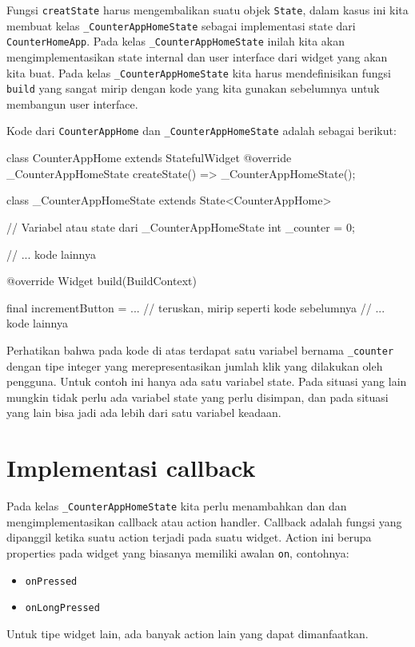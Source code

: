 \documentclass[a4paper,11pt]{article} %
\newcommand{\txtinline}[1]{\texttt{#1}}
\begin{document}
Fungsi \txtinline{creatState} harus mengembalikan suatu objek \txtinline{State},
dalam kasus ini kita membuat kelas \txtinline{_CounterAppHomeState} sebagai
implementasi state dari \txtinline{CounterHomeApp}.
Pada kelas \txtinline{_CounterAppHomeState} inilah kita akan mengimplementasikan
state internal dan user interface dari widget yang akan kita buat.
Pada kelas \txtinline{_CounterAppHomeState} kita harus mendefinisikan
fungsi \txtinline{build} yang sangat mirip dengan kode yang kita gunakan sebelumnya
untuk membangun user interface.

Kode dari \txtinline{CounterAppHome} dan \txtinline{_CounterAppHomeState}
adalah sebagai berikut:
\begin{dartcode}
class CounterAppHome extends StatefulWidget {
  @override
  _CounterAppHomeState createState() => _CounterAppHomeState();
}
  
class _CounterAppHomeState extends State<CounterAppHome> {

  // Variabel atau state dari _CounterAppHomeState
  int _counter = 0;

  // ... kode lainnya

  @override
  Widget build(BuildContext) {

    final incrementButton = ... // teruskan, mirip seperti kode sebelumnya
    // ... kode lainnya
  }
}
\end{dartcode}

Perhatikan bahwa pada kode di atas terdapat satu variabel bernama
\txtinline{_counter} dengan tipe integer yang merepresentasikan jumlah
klik yang dilakukan oleh pengguna. Untuk contoh ini hanya ada
satu variabel state. Pada situasi yang lain mungkin tidak perlu ada
variabel state yang perlu disimpan, dan pada situasi yang lain
bisa jadi ada lebih dari satu variabel keadaan.


\section{Implementasi callback}

Pada kelas \txtinline{_CounterAppHomeState} kita perlu menambahkan dan
dan mengimplementasikan callback atau action handler.
Callback adalah fungsi yang dipanggil ketika suatu action terjadi
pada suatu widget. Action ini berupa properties pada widget yang
biasanya memiliki awalan \txtinline{on}, contohnya:
\begin{itemize}
\item \txtinline{onPressed}
\item \txtinline{onLongPressed}
\end{itemize}
Untuk tipe widget lain, ada banyak action lain yang dapat dimanfaatkan.
\end{document}
